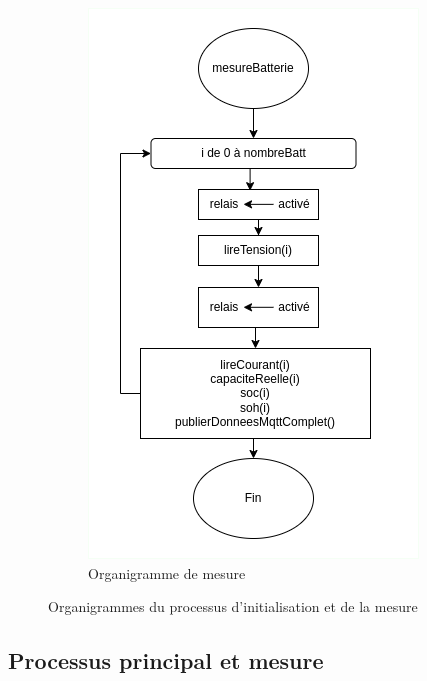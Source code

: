 \begin{figure}[H]
\begin{subfigure}{0.45\textwidth}
		\includegraphics[width=\textwidth]{./img/organigramme/mesure.png}
		\caption{Organigramme de mesure}
		\label{fig:organigramme_mesure}
	\end{subfigure}
	\caption{Organigrammes du processus d'initialisation et de la mesure}
	\label{fig:organigrammes_principal_mesure}
\end{figure}

\subsection{Processus principal et mesure}

